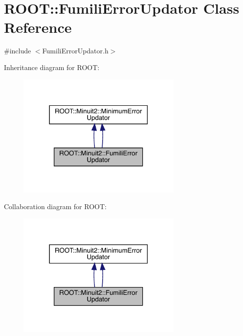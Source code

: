 \hypertarget{classROOT_1_1Minuit2_1_1FumiliErrorUpdator}{}\section{R\+O\+OT\+:\+:Fumili\+Error\+Updator Class Reference}
\label{classROOT_1_1Minuit2_1_1FumiliErrorUpdator}


{\ttfamily \#include $<$Fumili\+Error\+Updator.\+h$>$}



Inheritance diagram for R\+O\+OT\+:\nopagebreak
\begin{figure}[H]
\begin{center}
\leavevmode
\includegraphics[width=230pt]{d9/d85/classROOT_1_1Minuit2_1_1FumiliErrorUpdator__inherit__graph}
\end{center}
\end{figure}


Collaboration diagram for R\+O\+OT\+:\nopagebreak
\begin{figure}[H]
\begin{center}
\leavevmode
\includegraphics[width=230pt]{d0/d1b/classROOT_1_1Minuit2_1_1FumiliErrorUpdator__coll__graph}
\end{center}
\end{figure}
